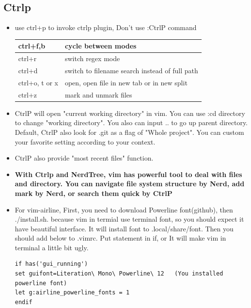\documentclass[a4paper,12pt,twoside]{book}
\begin{document}
\subsection{Ctrlp}
\begin{itemize}
\item use ctrl+p to invoke ctrlp plugin, Don't use :CtrlP command  \\ 
\begin{tabular}{|p{}|p{}|}
\hline 
ctrl+f,b  & cycle between modes \\ 
\hline 
ctrl+r & switch regex mode  \\ 
\hline 
ctrl+d & switch to filename search instead of full path \\ 
\hline 
ctrl+o, t or x & open, open file in new tab or in new split \\ 
\hline 
ctrl+z  & mark and unmark files \\ 
\hline 
\end{tabular} 
\item CtrlP will open "current working directory" in vim. You can use :cd directory to change "working directory". You also can input .. to go up parent directory. Default, CtrlP also look for .git as a flag of "Whole project". You can custom your favorite setting according to your context.

\item CtrlP also provide "most recent files" function.

\item \textbf{With Ctrlp and NerdTree, vim has powerful tool to deal with files and directory. You can navigate file system structure by Nerd, add mark by Nerd, or search them quick by CtrlP}
\end{itemize}


\begin{itemize}
		\subsection{vim-airline} 
\item For vim-airline,  First, you need to download Powerline font(github), then ./install.sh. because vim in termial use terminal font, so you should expect it have beautiful interface. It will install font to .local/share/font. Then you should add below to .vimrc.  Put statement in if, or It will make vim in terminal a little bit ugly. 
\begin{verbatim}
if has('gui_running')
set guifont=Literation\ Mono\ Powerline\ 12   (You installed powerline font)
let g:airline_powerline_fonts = 1
endif
\end{verbatim}
\end{itemize}
\end{document}
